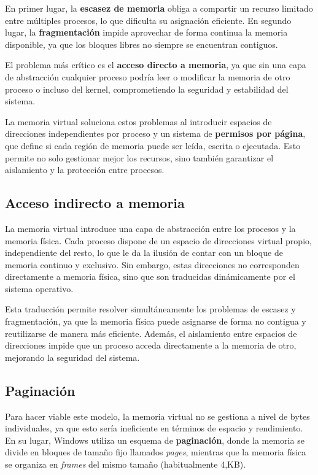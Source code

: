 En primer lugar, la \textbf{escasez de memoria} obliga a compartir un recurso limitado entre múltiples procesos, lo que dificulta su asignación eficiente. En segundo lugar, la \textbf{fragmentación} impide aprovechar de forma continua la memoria disponible, ya que los bloques libres no siempre se encuentran contiguos.

El problema más crítico es el \textbf{acceso directo a memoria}, ya que sin una capa de abstracción cualquier proceso podría leer o modificar la memoria de otro proceso o incluso del kernel, comprometiendo la seguridad y estabilidad del sistema.

La memoria virtual soluciona estos problemas al introducir espacios de direcciones independientes por proceso y un sistema de \textbf{permisos por página}, que define si cada región de memoria puede ser leída, escrita o ejecutada. Esto permite no solo gestionar mejor los recursos, sino también garantizar el aislamiento y la protección entre procesos.

\subsection{Acceso indirecto a memoria}

La memoria virtual introduce una capa de abstracción entre los procesos y la memoria física. Cada proceso dispone de un espacio de direcciones virtual propio, independiente del resto, lo que le da la ilusión de contar con un bloque de memoria continuo y exclusivo. Sin embargo, estas direcciones no corresponden directamente a memoria física, sino que son traducidas dinámicamente por el sistema operativo.

Esta traducción permite resolver simultáneamente los problemas de escasez y fragmentación, ya que la memoria física puede asignarse de forma no contigua y reutilizarse de manera más eficiente. Además, el aislamiento entre espacios de direcciones impide que un proceso acceda directamente a la memoria de otro, mejorando la seguridad del sistema.

\subsection{Paginación}

Para hacer viable este modelo, la memoria virtual no se gestiona a nivel de bytes individuales, ya que esto sería ineficiente en términos de espacio y rendimiento. En su lugar, Windows utiliza un esquema de \textbf{paginación}, donde la memoria se divide en bloques de tamaño fijo llamados \textit{pages}, mientras que la memoria física se organiza en \textit{frames} del mismo tamaño (habitualmente 4,KB).

